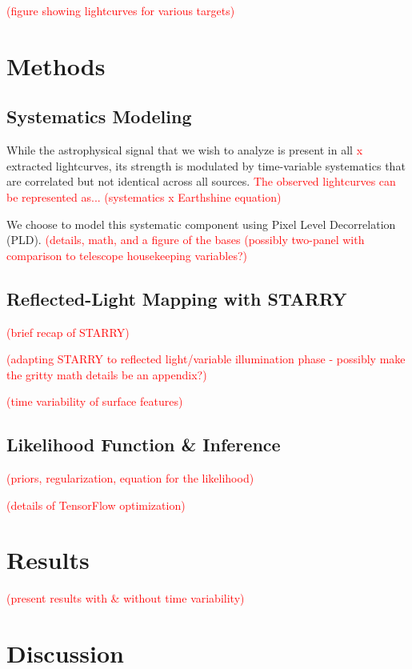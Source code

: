 \documentclass[modern]{aastex62}
\newcommand{\todo}[1]{\textcolor{red}{#1}}
\begin{document}
\todo{(figure showing lightcurves for various targets)}

\section{Methods}
\label{sec:methods}

\subsection{Systematics Modeling}

While the astrophysical signal that we wish to analyze is present in all \todo{x} extracted lightcurves, its strength is modulated by time-variable systematics that are correlated but not identical across all sources. 
\todo{The observed lightcurves can be represented as... (systematics x Earthshine equation)}

We choose to model this systematic component using Pixel Level Decorrelation (PLD). \todo{(details, math, and a figure of the bases (possibly two-panel with comparison to telescope housekeeping variables?)}

\subsection{Reflected-Light Mapping with STARRY}

\todo{(brief recap of STARRY)}

\todo{(adapting STARRY to reflected light/variable illumination phase - possibly make the gritty math details be an appendix?)}

\todo{(time variability of surface features)}

\subsection{Likelihood Function \& Inference}

\todo{(priors, regularization, equation for the likelihood)}

\todo{(details of TensorFlow optimization)}

\section{Results}
\label{sec:results}

\todo{(present results with \& without time variability)}

\section{Discussion}
\label{sec:discussion}
\end{document}
